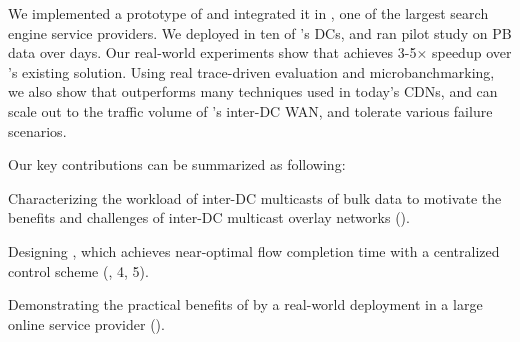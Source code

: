 We implemented a prototype of \name and integrated it in
\company,
one of the largest search engine service
providers. We deployed \name in ten of \company's DCs, and
ran pilot study on \fillme PB data over \fillme days. Our
real-world experiments show that \name achieves 3-5$\times$
speedup over \company's existing solution.
Using real trace-driven evaluation and microbanchmarking,
we also show that \name outperforms many techniques used in
today's CDNs, and \name can scale out to the traffic volume
of \company's inter-DC WAN, and tolerate various failure
scenarios.


Our key contributions can be summarized as following:
\begin{packeditemize}
\item Characterizing the workload of inter-DC multicasts of bulk data
to motivate the benefits and challenges of inter-DC multicast overlay
networks ().
\item Designing \name, which achieves near-optimal flow completion 
time with a centralized control scheme (, 4, 5).
\item Demonstrating the practical benefits of \name by a real-world
 deployment in a large online service provider ().
\end{packeditemize}
